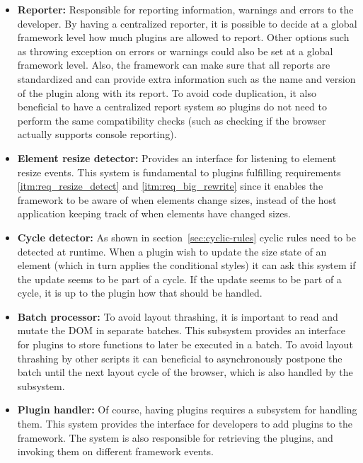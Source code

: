 \documentclass[a4paper,11pt]{kth-mag}
\begin{document}
        \begin{itemize}
          \item \textbf{Reporter:}
            Responsible for reporting information, warnings and errors to the developer.
            By having a centralized reporter, it is possible to decide at a global framework level how much plugins are allowed to report.
            Other options such as throwing exception on errors or warnings could also be set at a global framework level.
            Also, the framework can make sure that all reports are standardized and can provide extra information such as the name and version of the plugin along with its report.
            To avoid code duplication, it also beneficial to have a centralized report system so plugins do not need to perform the same compatibility checks (such as checking if the \gls{browser} actually supports console reporting).
          \item \textbf{Element resize detector:}
            Provides an interface for listening to \gls{element} resize events.
            This system is fundamental to plugins fulfilling requirements \ref{itm:req_resize_detect} and \ref{itm:req_big_rewrite} since it enables the framework to be aware of when \glspl{element} change sizes, instead of the host application keeping track of when \glspl{element} have changed sizes.
          \item \textbf{Cycle detector:}
            As shown in section~\ref{sec:cyclic-rules} cyclic rules need to be detected at runtime.
            When a plugin wish to update the size state of an \gls{element} (which in turn applies the conditional styles) it can ask this system if the update seems to be part of a cycle.
            If the update seems to be part of a cycle, it is up to the plugin how that should be handled.
          \item \textbf{Batch processor:}
            To avoid layout thrashing, it is important to read and mutate the \gls{DOM} in separate batches.
            This subsystem provides an interface for plugins to store functions to later be executed in a batch.
            To avoid layout thrashing by other scripts it can beneficial to asynchronously postpone the batch until the next layout cycle of the \gls{browser}, which is also handled by the subsystem.
          \item \textbf{Plugin handler:}
            Of course, having plugins requires a subsystem for handling them.
            This system provides the interface for developers to add plugins to the framework.
            The system is also responsible for retrieving the plugins, and invoking them on different framework events.
        \end{itemize}
\end{document}
